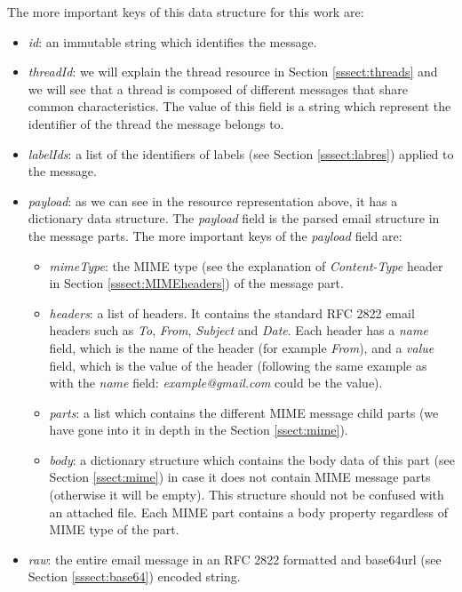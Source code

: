 The more important keys of this data structure for this work are:
\begin{itemize}
	\item\textit{id}: an immutable string which identifies the message.
	\item\textit{threadId}: we will explain the thread resource in Section \ref{sssect:threads} and we will see that a thread is composed of different messages that share common characteristics. The value of this field is a string which represent the identifier of the thread the message belongs to.
	\item\textit{labelIds}: a list of the identifiers of labels (see Section \ref{sssect:labres}) applied to the message.
	\item\textit{payload}: as we can see in the resource representation above, it has a dictionary data structure. The \textit{payload} field is the parsed email structure in the message parts. The more important keys of the \textit{payload} field are:
	\begin{itemize}
		\item\textit{mimeType}: the MIME type (see the explanation of \textit{Content-Type} header in Section \ref{sssect:MIMEheaders}) of the message part.
		\item\textit{headers}: a list of headers. It contains the standard RFC 2822 \citep{rfc2822} email headers such as \textit{To}, \textit{From}, \textit{Subject} and \textit{Date}. Each header has a \textit{name} field, which is the name of the header (for example \textit{From}), and a \textit{value} field, which is the value of the header (following the same example as with the \textit{name} field: \textit{example@gmail.com} could be the value).
		\item\textit{parts}: a list which contains the different MIME message child parts (we have gone into it in depth in the Section \ref{ssect:mime}).
		\item\textit{body}: a dictionary structure which contains the body data of this part (see Section \ref{ssect:mime}) in case it does not contain MIME message parts (otherwise it will be empty). This structure should not be confused with an attached file. Each MIME part contains a body property regardless of MIME type of the part.
	\end{itemize}
	\item\textit{raw}: the entire email message in an RFC 2822 \citep{rfc2822} formatted and base64url (see Section \ref{sssect:base64}) encoded string.
\end{itemize}

